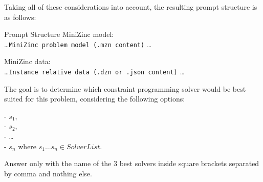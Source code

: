\documentclass[../../main]{subfiles}
\begin{document}
Taking all of these considerations into account, the resulting prompt structure is as follows:

\begin{definition}{Prompt Structure}
    MiniZinc model:\\
    \ldots \texttt{MiniZinc problem model (\texttt{.mzn} content)} \ldots

    \vspace{0.5em}
    MiniZinc data:\\
    \ldots \texttt{Instance relative data (\texttt{.dzn} or \texttt{.json} content)} \ldots

    \vspace{0.5em}
    The goal is to determine which constraint programming solver would be best suited for this problem, considering the following options:

        - $s_1$,\\
        - $s_2$,\\
        - \ldots\\
        - $s_n$
    where $s_1 \ldots s_n \in SolverList$.

    Answer only with the name of the 3 best solvers inside square brackets separated by comma and nothing else.
\end{definition}


\end{document}
